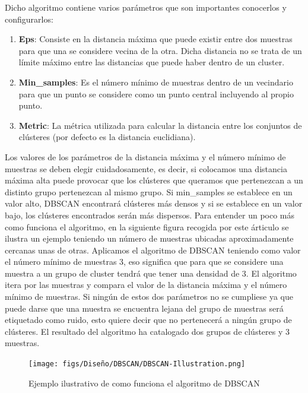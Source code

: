 Dicho algoritmo contiene varios parámetros que son importantes conocerlos y configurarlos: 
\begin{enumerate}
  \item \textbf{Eps}: Consiste en la distancia máxima que puede existir entre dos muestras para que una se considere vecina de la otra. Dicha distancia no se trata de un límite 
  máximo entre las distancias que puede haber dentro de un cluster.
  \item \textbf{Min\_samples}: Es el número mínimo de muestras dentro de un vecindario para que un punto se considere como un punto central incluyendo al propio punto.
  \item \textbf{Metric}: La métrica utilizada para calcular la distancia entre los conjuntos de clústeres (por defecto es la distancia euclidiana). 
\end{enumerate}
Los valores de los parámetros de la distancia máxima y el número mínimo de muestras se deben elegir cuidadosamente, es decir, si colocamos una distancia 
máxima alta puede provocar que los clústeres que queramos que pertenezcan a un distinto grupo pertenezcan al mismo grupo. 
Si min\_samples se establece en un valor alto, DBSCAN encontrará clústeres más densos y 
si se establece en un valor bajo, los clústeres encontrados serán más dispersos. \newline
Para entender un poco más como funciona el algoritmo, en la siguiente figura recogida por este árticulo\cite{DBSCAN} se ilustra 
un ejemplo teniendo un número de muestras ubicadas aproximadamente cercanas unas de otras. Aplicamos el algoritmo de DBSCAN 
teniendo como valor el número mínimo de muestras 3, eso significa que para que se considere una muestra a un grupo de cluster tendrá que tener una densidad de 3. El algoritmo itera por
las muestras y compara el valor de la distancia máxima y el número mínimo de muestras. 
Si ningún de estos dos parámetros no se cumpliese ya que puede darse que una muestra se encuentra lejana del grupo de muestras será etiquetado como ruido, esto quiere decir
que no pertenecerá a ningún grupo de clústeres. El resultado del algoritmo ha catalogado dos grupos de clústeres y 3 muestras. \newline

\begin{figure} [H]
  \begin{center}
    \texttt{[image: figs/Diseño/DBSCAN/DBSCAN-Illustration.png]}
  \end{center}
  \caption{Ejemplo ilustrativo de como funciona el algoritmo de DBSCAN}
  \label{fig:pesos_preentrenados}
\end{figure}\

